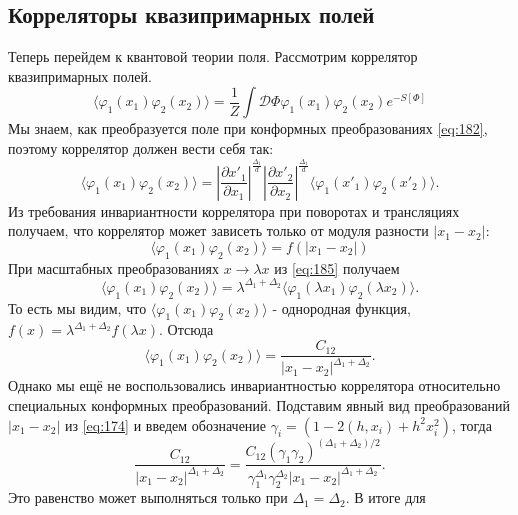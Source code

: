 \documentclass[a4paper,12pt]{article} \usepackage[utf8x]{inputenc} \usepackage[russian]{babel}
\theoremstyle{definition} \newtheorem{corollary}{Corollary}[theorem] \theoremstyle{definition}
\begin{document}
\subsection{Корреляторы квазипримарных полей}
\label{sec:quasiprimary-correlators}

Теперь перейдем к квантовой теории поля. Рассмотрим коррелятор квазипримарных полей.
\begin{equation}
  \label{eq:184} \langle \varphi_{1}(x_{1}) \varphi_{2}(x_{2})\rangle = \frac{1}{Z} \int \mathcal{D}
\Phi \varphi_{1}(x_{1})\varphi_{2}(x_{2}) e^{-S[\Phi]}
\end{equation} Мы знаем, как преобразуется поле при конформных преобразованиях \eqref{eq:182},
поэтому коррелятор должен вести себя так:
\begin{equation}
  \label{eq:185} \langle \varphi_{1}(x_{1})\varphi_{2}(x_{2})\rangle = \left|\frac{\partial
x'_{1}}{\partial x_{1}}\right|^{\frac{\Delta_{1}}{d}}\left| \frac{\partial x'_{2}}{\partial
x_{2}}\right|^{\frac{\Delta_{1}}{d}} \langle \varphi_{1}(x'_{1})\varphi_{2}(x'_{2})\rangle .
\end{equation} Из требования инвариантности коррелятора при поворотах и трансляциях получаем, что
коррелятор может зависеть только от модуля разности $\left|x_{1}-x_{2}\right|$:
\begin{equation}
  \label{eq:186} \langle \varphi_{1}(x_{1}) \varphi_{2}(x_{2})\rangle = f(\left|x_{1}-x_{2}\right|)
\end{equation} При масштабных преобразованиях $x\to \lambda x$ из \eqref{eq:185} получаем
\begin{equation}
  \label{eq:187} \langle \varphi_{1}(x_{1})
\varphi_{2}(x_{2})\rangle=\lambda^{\Delta_{1}+\Delta_{2}} \langle \varphi_{1}(\lambda x_{1})
\varphi_{2}(\lambda x_{2})\rangle .
\end{equation} То есть мы видим, что $ \langle \varphi_{1}(x_{1}) \varphi_{2}(x_{2})\rangle$ -
однородная функция, $f(x)=\lambda^{\Delta_{1}+\Delta_{2}} f(\lambda x)$. Отсюда
\begin{equation}
  \label{eq:188} \langle \varphi_{1}(x_{1}) \varphi_{2}(x_{2})\rangle =
\frac{C_{12}}{\left|x_{1}-x_{2}\right|^{\Delta_{1}+\Delta_{2}}}.
\end{equation} Однако мы ещё не воспользовались инвариантностью коррелятора относительно специальных
конформных преобразований. Подставим явный вид преобразований $\left|x_{1}-x_{2}\right|$ из
\eqref{eq:174} и введем обозначение $\gamma_{i}=\left(1-2(h,x_{i})+h^{2}x_{i}^{2}\right)$, тогда
\begin{equation}
  \label{eq:189}
\frac{C_{12}}{\left|x_{1}-x_{2}\right|^{\Delta_{1}+\Delta_{2}}}=\frac{C_{12}(\gamma_{1}\gamma_{2})^{(\Delta_{1}+\Delta_{2})/2}}{\gamma_{1}^{\Delta_{1}}\gamma_{2}^{\Delta_{2}}
\left|x_{1}-x_{2}\right|^{\Delta_1+\Delta_2}}.
\end{equation} Это равенство может выполняться только при $\Delta_{1}=\Delta_{2}$. В итоге для
\end{document}
